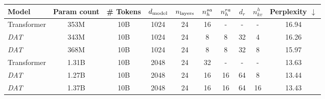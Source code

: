    \begin{tabular}{@{}lcc|cccccc|c@{}}
        \toprule
        Model        & Param count   & \# Tokens &$d_{\mathrm{model}}$&$n_{\mathrm{layers}}$& $n_h^{sa}$  & $n_h^{ra}$ & $d_r$ & $n_{kv}^{h}$ & Perplexity $\downarrow$ \\ \midrule\hline
        Transformer  & 353M   & 10B       & 1024    & 24       & 16       & -        & -     & -           & 16.94     \\
        \textit{DAT} & 343M   & 10B       & 1024    & 24       & 8        & 8        & 32    & 4           & 16.26     \\
        \textit{DAT} & 368M   & 10B       & 1024    & 24       & 8        & 8        & 32    & 8           & 15.97     \\\midrule
        Transformer  & 1.31B  & 10B       & 2048    & 24       & 32       & -        & -     & -           & 13.63     \\
        \textit{DAT} & 1.27B  & 10B       & 2048    & 24       & 16       & 16       & 64    & 8           & 13.44     \\
        \textit{DAT} & 1.37B  & 10B       & 2048    & 24       & 16       & 16       & 64    & 16          & 13.43     \\ \bottomrule
        \end{tabular}%
